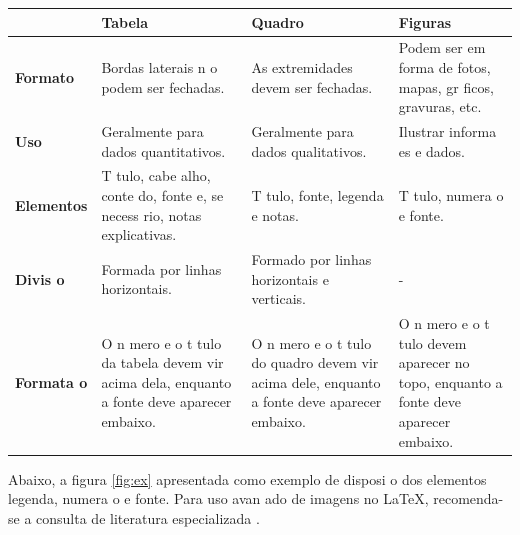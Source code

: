 \documentclass{article}
\begin{document}
		
\begin{quadro}[H]
	\centering
	\caption{Alguns detalhes sobre elementos flutuantes}
	\label{quadroex1}
	\begin{tabular}{|l|m{4cm}|m{4cm}|m{4cm}|}
		\hline
		& \textbf{Tabela}                                                                             & \textbf{Quadro}                                                                             & \textbf{Figuras}                                                                    \\ \hline
		\textbf{Formato}    & Bordas laterais n o podem ser fechadas.                                                     & As extremidades devem ser fechadas.                                                         & Podem ser em forma de fotos, mapas, gr ficos, gravuras, etc.                        \\ \hline
		\textbf{Uso}        & Geralmente para dados quantitativos.                                                        & Geralmente para dados qualitativos.                                                         & Ilustrar informa es e dados.                                                       \\ \hline
		\textbf{Elementos}  & T tulo, cabe alho, conte do, fonte e, se necess rio, notas explicativas.                    & T tulo, fonte, legenda e notas.                                                             & T tulo, numera o e fonte.                                                          \\ \hline
		\textbf{Divis o}    & Formada por linhas horizontais.                                                               & Formado por linhas horizontais e verticais.                                                 & -                                                                                   \\ \hline
		\textbf{Formata o} & O n mero e o t tulo da tabela devem vir acima dela, enquanto a fonte deve aparecer embaixo. & O n mero e o t tulo do quadro devem vir acima dele, enquanto a fonte deve aparecer embaixo. & O n mero e o t tulo devem aparecer no topo, enquanto a fonte deve aparecer embaixo. \\ \hline
	\end{tabular}
\end{quadro}
				
Abaixo, a figura \ref{fig:ex}   apresentada como exemplo de disposi o dos elementos legenda, numera o e fonte.
Para uso avan ado de imagens no \LaTeX, recomenda-se a consulta de literatura especializada \cite{Goossens2007}.
\end{document}

